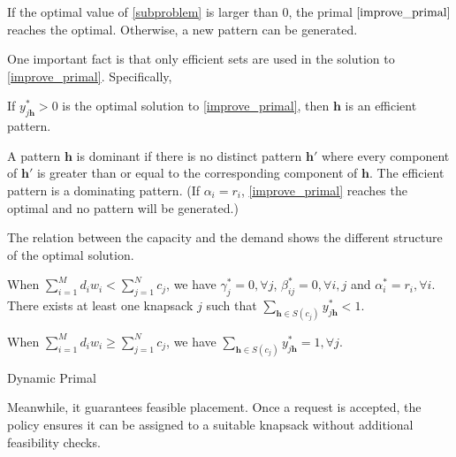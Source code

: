 If the optimal value of \eqref{subproblem} is larger than $0$, the primal $\eqref{improve_primal}$ reaches the optimal. Otherwise, a new pattern can be generated.

One important fact is that only efficient sets are used in the solution to \eqref{improve_primal}. Specifically, 

\begin{lem}
    If $y_{j \bm{h}}^{*} > 0$ is the optimal solution to \eqref{improve_primal}, then $\bm{h}$ is an efficient pattern.
\end{lem}


A pattern $\bm{h}$ is dominant if there is no distinct pattern $\bm{h}{'}$ where every component of $\bm{h}{'}$ is greater than or equal to the corresponding component of $\bm{h}$. The efficient pattern is a dominating pattern. (If $\alpha_{i} = r_i$, \eqref{improve_primal} reaches the optimal and no pattern will be generated.)

The relation between the capacity and the demand shows the different structure of the optimal solution.

\begin{lem}
When $\sum_{i=1}^{M} d_{i} w_{i} < \sum_{j=1}^{N} c_{j}$, we have $\gamma_{j}^{*} =0, \forall j$, $\beta_{ij}^{*} =0, \forall i,j$ and $\alpha^{*}_{i} = r_i, \forall i$. There exists at least one knapsack $j$ such that $\sum_{\bm{h} \in S(c_{j})} y_{j \bm{h}}^{*} < 1$.

When $\sum_{i=1}^{M} d_{i} w_{i} \geq \sum_{j=1}^{N} c_{j}$, we have $\sum_{\bm{h} \in S(c_{j})} y_{j \bm{h}}^{*} = 1, \forall j$.
\end{lem}



\begin{algorithm}[H]
    \caption{Dynamic Primal}\label{algo_improve_primal}
\end{algorithm}

Meanwhile, it guarantees feasible placement. Once a request is accepted, the policy ensures it can be assigned to a suitable knapsack without additional feasibility checks.

